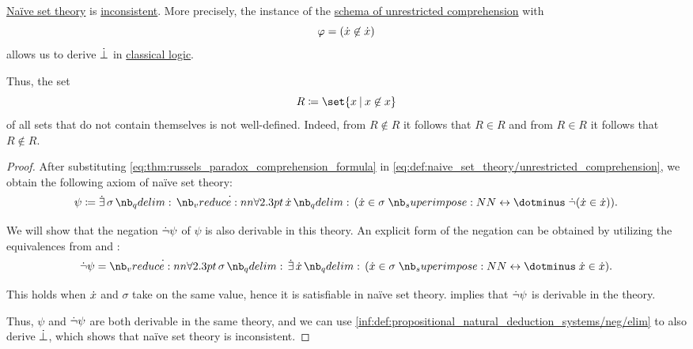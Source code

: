 \begin{theorem}\label{thm:russels_paradox}
  \hyperref[def:naive_set_theory]{Na\"ive set theory} is \hyperref[def:first_order_theory/consistent]{inconsistent}. More precisely, the instance of the \hyperref[def:naive_set_theory/unrestricted_comprehension]{schema of unrestricted comprehension} with
  \begin{equation}\label{eq:thm:russels_paradox_comprehension_formula}
    \varphi = ({\dot{x}} \not\in {\dot{x}})
  \end{equation}
  allows us to derive \( \dot\bot \) in \hyperref[def:classical_logic]{classical logic}.
\end{theorem}
\begin{comments}
  \item Thus, the set
  \begin{equation}\label{eq:thm:russels_paradox_set}
    R \coloneqq \set{ x \given x \not\in x }
  \end{equation}
  of all sets that do not contain themselves is not well-defined. Indeed, from \( R \not\in R \) it follows that \( R \in R \) and from \( R \in R \) it follows that \( R \not\in R \).
\end{comments}
\begin{proof}
  After substituting \eqref{eq:thm:russels_paradox_comprehension_formula} in \eqref{eq:def:naive_set_theory/unrestricted_comprehension}, we obtain the following axiom of na\"ive set theory:
  \begin{equation}\label{eq:thm:russels_paradox_comprehension_axiom}
    \psi \coloneqq \qexists \sigma \qforall \synx (\synx \in \sigma \syniff \synneg (\synx \in \synx)).
  \end{equation}

  We will show that the negation \( \dot\neg\psi \) of \( \psi \) is also derivable in this theory. An explicit form of the negation can be obtained by utilizing the equivalences from  and :
  \begin{equation*}
    \synneg\psi = \qforall \sigma \qexists \synx (\synx \in \sigma \syniff \synx \in \synx).
  \end{equation*}

  This holds when \( {\dot{x}} \) and \( \sigma \) take on the same value, hence it is satisfiable in na\"ive set theory.  implies that \( \dot\neg\psi \) is derivable in the theory.

  Thus, \( \psi \) and \( \dot\neg\psi \) are both derivable in the same theory, and we can use \ref{inf:def:propositional_natural_deduction_systems/neg/elim} to also derive \( \dot\bot \), which shows that na\"ive set theory is inconsistent.
\end{proof}

